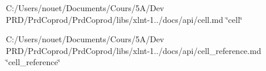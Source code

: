 
\begin{DoxyItemize}
\item C\+:/\+Users/nouet/\+Documents/\+Cours/5\+A/\+Dev PRD/\+Prd\+Coprod/\+Prd\+Coprod/libs/xlnt-\/1../docs/api/cell.md \char`\"{}cell\char`\"{}
\item C\+:/\+Users/nouet/\+Documents/\+Cours/5\+A/\+Dev PRD/\+Prd\+Coprod/\+Prd\+Coprod/libs/xlnt-\/1../docs/api/cell\+\_\+reference.md \char`\"{}cell\+\_\+reference\char`\"{} 
\end{DoxyItemize}
